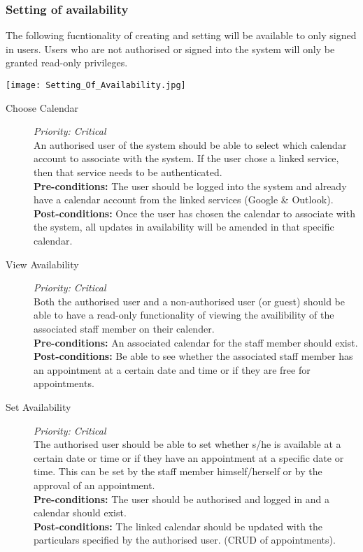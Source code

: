 \subsubsection{Setting of availability}
The following fucntionality of creating and setting will be available to only signed in users. Users who are not authorised or signed into the system will only be granted read-only privileges.

\texttt{[image: Setting\_Of\_Availability.jpg]}

\begin{description}

\item[Choose Calendar]\hfill \textit{Priority: Critical} \\
An authorised user of the system should be able to select which calendar account to associate with the system. If the user chose a linked service, then that service needs to be authenticated.\\
\textbf{Pre-conditions:} The user should be logged into the system and already have a calendar account from the linked services (Google \& Outlook). \\
\textbf{Post-conditions:} Once the user has chosen the calendar to associate with the system, all updates in availability will be amended in that specific calendar.

\item[View Availability]\hfill \textit{Priority: Critical} \\
Both the authorised user and a non-authorised user (or guest) should be able to have a read-only functionality of viewing the availibility of the associated staff member on their calender.\\
\textbf{Pre-conditions:} An associated calendar for the staff member should exist.\\
\textbf{Post-conditions:} Be able to see whether the associated staff member has an appointment at a certain date and time or if they are free for appointments. 

\item[Set Availability]\hfill \textit{Priority: Critical} \\
The authorised user should be able to set whether s/he is available at a certain date or time or if they have an appointment at a specific date or time. This can be set by the staff member himself/herself or by the approval of an appointment.\\
\textbf{Pre-conditions:} The user should be authorised and logged in and a calendar should exist.\\
\textbf{Post-conditions:} The linked calendar should be updated with the particulars specified by the authorised user. (CRUD of appointments).
\end{description}